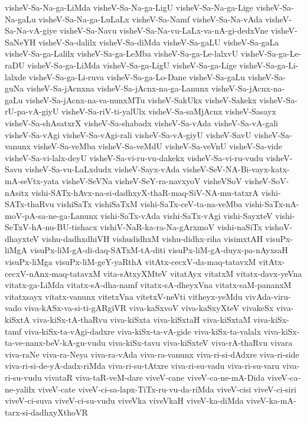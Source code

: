 {visheV-Sa-Na-ga-LiMda
visheV-Sa-Na-ga-LigU
visheV-Sa-Na-ga-Lige
visheV-Sa-Na-gaLu
visheV-Sa-Na-ga-LuLaLx
visheV-Sa-Namf
visheV-Sa-Na-vAda
visheV-Sa-Na-vA-giye
visheV-Sa-Navu
visheV-Sa-Na-vu-LaLx-va-nA-gi-dedxVne
visheV-SaNeYH
visheV-Sa-dalilx
visheV-Sa-diMda
visheV-Sa-gaLU
visheV-Sa-gaLa
visheV-Sa-ga-Lalilx
visheV-Sa-ga-LeMba
visheV-Sa-ga-Le-lalxvU
visheV-Sa-ga-Le-raDU
visheV-Sa-ga-LiMda
visheV-Sa-ga-LigU
visheV-Sa-ga-Lige
visheV-Sa-ga-Li-lalxde
visheV-Sa-ga-Li-ruva
visheV-Sa-ga-Lo-Dane
visheV-Sa-gaLu
visheV-Sa-guNa
visheV-Sa-jAcnxna
visheV-Sa-jAcnx-na-ga-Lanunx
visheV-Sa-jAcnx-na-gaLu
visheV-Sa-jAcnx-na-va-nunxMTu
visheV-SakUkx
visheV-Sakekx
visheV-Sa-rU-pa-vA-giyU
visheV-Sa-riV-ti-yalUlx
visheV-Sa-saMjAcnx
visheV-Sasayx
visheV-Sa-shAsatxrX
visheV-Sa-shabadx
visheV-Sa-vAda
visheV-Sa-vA-gali
visheV-Sa-vAgi
visheV-Sa-vAgi-rali
visheV-Sa-vA-giyU
visheV-SavU
visheV-Sa-vanunx
visheV-Sa-veMba
visheV-Sa-veMdU
visheV-Sa-veVnU
visheV-Sa-vide
visheV-Sa-vi-lalx-deyU
visheV-Sa-vi-ru-vu-dakekx
visheV-Sa-vi-ru-vudu
visheV-Savu
visheV-Sa-vu-LaLxdudx
visheV-Sayx-vAda
visheV-SeV-NA-Bi-vayx-katx-mA-seVtx-yata
visheV-SeVNa
visheV-SeY-ra-navxyoV
visheVSoV
visheV-SoV-nAsitx
vishi-SATx-hAvx-na-si-dadhxyX-thaR-maq-SiV-NA-mu-tatxrA
vishi-SATx-thaRvu
vishiSaTx
vishiSaTxM
vishi-SaTx-ceV-ta-na-veMba
vishi-SaTx-nA-moV-pA-sa-ne-ga-Lanunx
vishi-SaTx-vAda
vishi-SaTx-vAgi
vishi-SayxteV
vishi-SeTxV-hA-nu-BU-tishacx
vishiV-NaR-ka-ra-Na-gArxmoV
vishi-naSiTx
vishoV-dhayxteV
vishu-dadhxdhiVH
vishudidhxM
vishu-didhx-riha
visimxtAH
visuPx-liMgA
visuPx-liM-gA-di-daq-SATxM-tA-diti
visuPx-liM-gA-duyx-pa-nAyxsaH
visuPx-liMga
visuPx-liM-geY-yaRthA
vitAtx-cecxV-da-maq-tatavxM
vitAtx-cecxV-nAnx-maq-tatavxM
vita-sAtxyXMteV
vitatAyx
vitatxM
vitatx-davx-yeVna
vitatx-ga-LiMda
vitatx-sA-dha-namf
vitatx-sA-dheyxVna
vitatx-saM-pananxM
vitatxsayx
vitatx-vanunx
vitetxVna
vitetxV-neVti
vitheyx-yeMdu
vivAda-viru-vado
viva-kASx-va-si-ti-gARgiVR
viva-kaSxvoV
viva-kaSxyXteV
vivakeSx
viva-kiSxtA
viva-kiSx-tA-thaRvu
viva-kiSxta
viva-kiSxtaH
viva-kiSxtaM
viva-kiSx-tamf
viva-kiSx-ta-vAgi-dadxre
viva-kiSx-ta-vA-gide
viva-kiSx-ta-valalx
viva-kiSx-ta-ve-nanx-beV-kA-gu-vudu
viva-kiSx-tavu
viva-kiSxteV
viva-rA-thaRvu
vivara
viva-raNe
viva-ra-Neya
viva-ra-vAda
viva-ra-vanunx
viva-ri-si-dAdxre
viva-ri-side
viva-ri-si-de-yA-dadx-riMda
viva-ri-su-tAtxre
viva-ri-su-vadu
viva-ri-su-varu
viva-ri-su-vudu
vivataR
viva-taR-veM-dare
viveV-cane
viveV-ca-ne-mA-Dida
viveV-ca-ne-yalilx
viveV-cate
viveV-ci-sa-lapx-TiTx-ru-vu-da-riMda
viveV-cisi
viveV-ci-siri
viveV-ci-suva
viveV-ci-su-vudu
viveVka
viveVkaH
viveV-ka-diMda
viveV-ka-mA-tarx-si-dadhxyXthoVR
}
